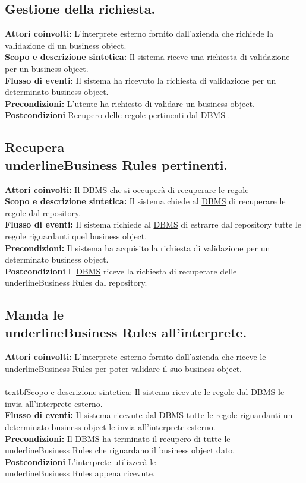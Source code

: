 \subsection{Gestione della richiesta.}
\textbf{Attori coinvolti:} L'interprete esterno fornito dall'azienda che richiede la validazione di un business object.\\
\textbf{Scopo e descrizione sintetica:} Il sistema riceve una richiesta di validazione per un business object.\\
\textbf{Flusso di eventi:} Il sistema ha ricevuto la richiesta di validazione per un determinato business object.\\
\textbf{Precondizioni:} L'utente ha richiesto di validare un business object.\\
\textbf{Postcondizioni} Recupero delle regole pertinenti dal \underline{DBMS} .

\subsection{Recupera \\underline{Business Rules} pertinenti.}
\textbf{Attori coinvolti:} Il \underline{DBMS} che si occuper\`a di recuperare le regole\\
\textbf{Scopo e descrizione sintetica:} Il sistema chiede al \underline{DBMS} di recuperare le regole dal repository.\\
\textbf{Flusso di eventi:} Il sistema richiede al \underline{DBMS} di estrarre dal repository tutte le regole riguardanti quel business object.\\
\textbf{Precondizioni:} Il sistema ha acquisito la richiesta di validazione per un determinato business object.\\
\textbf{Postcondizioni} Il \underline{DBMS} riceve la richiesta di recuperare delle \\underline{Business Rules} dal repository.
\subsection{Manda le \\underline{Business Rules} all'interprete.}
\textbf{Attori coinvolti:} L'interprete esterno fornito dall'azienda che riceve le \\underline{Business Rules} per poter validare il suo business object.\\
\\textbf{Scopo e descrizione sintetica:} Il sistema ricevute le regole dal \underline{DBMS} le invia all'interprete esterno.\\
\textbf{Flusso di eventi:} Il sistema ricevute dal \underline{DBMS} tutte le regole riguardanti un determinato business object le invia all'interprete esterno.\\
\textbf{Precondizioni:} Il \underline{DBMS} ha terminato il recupero di tutte le \\underline{Business Rules} che riguardano il business object dato.\\
\textbf{Postcondizioni} L'interprete utilizzer\`a le \\underline{Business Rules} appena ricevute.

